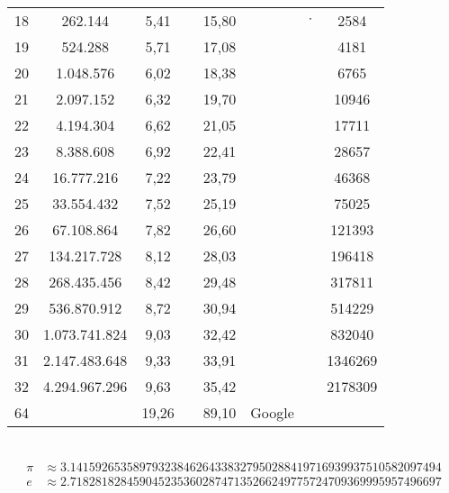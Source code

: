 \documentclass[a4paper,oneside,12pt]{article}
\newenvironment{description*}%
{
\begin{description}
\setlength{\itemsep}{0pt}
\setlength{\parskip}{2pt}
}
{\end{description}}
\begin{document}
\begin{description*}
\begin{tabular}[h]{|c|c|c|c|c|c|c|c|}
       18 &       262.144 & 5,41 &          & 15,80 &                 & $\cdot$ & 2584 \\
       19 &       524.288 & 5,71 &          & 17,08 &                 &         & 4181 \\
       20 &     1.048.576 & 6,02 &          & 18,38 &                 &         & 6765 \\
       21 &     2.097.152 & 6,32 &          & 19,70 &                 &         & 10946 \\
       22 &     4.194.304 & 6,62 &          & 21,05 &                 &         & 17711 \\
       23 &     8.388.608 & 6,92 &          & 22,41 &                 &         & 28657 \\
       24 &    16.777.216 & 7,22 &          & 23,79 &                 &         & 46368 \\
       25 &    33.554.432 & 7,52 &          & 25,19 &                 &         & 75025 \\
       26 &    67.108.864 & 7,82 &          & 26,60 &                 &         & 121393 \\
       27 &   134.217.728 & 8,12 &          & 28,03 &                 &         & 196418 \\
       28 &   268.435.456 & 8,42 &          & 29,48 &                 &         & 317811 \\
       29 &   536.870.912 & 8,72 &          & 30,94 &                 &         & 514229 \\
       30 & 1.073.741.824 & 9,03 &          & 32,42 &                 &         & 832040 \\
       31 & 2.147.483.648 & 9,33 &          & 33,91 &                 &         & 1346269 \\
       32 & 4.294.967.296 & 9,63 &          & 35,42 &                 &         & 2178309 \\
       64 &              & 19,26 &          & 89,10 & Google          &         &  \\ \hline
    \end{tabular} \\[12pt]

    \begin{align*}
    \pi &\approx 3.14159265358979323846264338327950288419716939937510582097494 \\
    e &\approx 2.71828182845904523536028747135266249775724709369995957496697
    \end{align*}


\end{description*}
\end{document}
